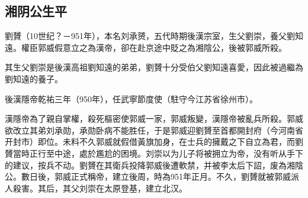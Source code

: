 \subsection{湘阴公生平}

劉贇（10世纪？－951年），本名刘承赟，五代時期後漢宗室，生父劉崇，養父劉知遠。權臣郭威假意立之為漢帝，卻在赴京途中貶之為湘陰公，後被郭威所殺。

其生父劉崇是後漢高祖劉知遠的弟弟，劉贇十分受伯父劉知遠喜愛，因此被過繼為劉知遠的養子。

後漢隱帝乾祐三年（950年），任武寧節度使（駐守今江苏省徐州市）。

漢隱帝為了親自掌權，殺死樞密使郭威一家，郭威叛變，漢隱帝被亂兵所殺。郭威欲改立其弟刘承勋，承勋卧病不能胜任，于是郭威迎劉贇至首都開封府（今河南省开封市）即位。未料不久郭威就假借黃旗加身，在士兵的擁戴之下自立為君，而劉贇當時正行至中途，處於尷尬的困境。刘崇以为儿子将被拥立为帝，没有听从手下的建议，按兵不动。劉贇在其衛兵投降郭威後遭軟禁，并被李太后下詔，废為湘陰公。數日後，郭威正式稱帝，建立後周，時為951年正月。不久，劉贇就被郭威派人殺害。其后，其父刘崇在太原登基，建立北汉。

